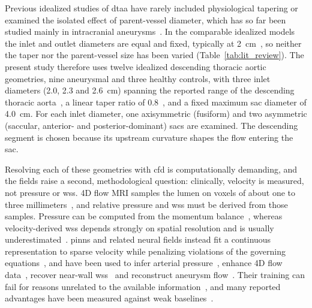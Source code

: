 \documentclass[12pt,a4paper]{article}
\newcommand{\CFD}{\ac{cfd}\xspace}
\newcommand{\DTAA}{\ac{dtaa}\xspace}
\newcommand{\WSS}{\ac{wss}\xspace}
\newcommand{\PINNscap}{\Acp{pinn}\xspace}
\theoremstyle{definition}
\numberwithin{equation}{section}
\begin{document}
Previous idealized studies of \DTAA have rarely included physiological tapering or examined the isolated effect of parent-vessel diameter, which has so far been studied mainly in intracranial aneurysms~\cite{fattahi2023influence}. In the comparable idealized models the inlet and outlet diameters are equal and fixed, typically at 2~cm~\cite{rehman2024comparative,rehman2025application}, so neither the taper nor the parent-vessel size has been varied (Table~\ref{tab:lit_review}). The present study therefore uses twelve idealized descending thoracic aortic geometries, nine aneurysmal and three healthy controls, with three inlet diameters (2.0, 2.3 and 2.6~cm) spanning the reported range of the descending thoracic aorta~\cite{hager2002diameters}, a linear taper ratio of 0.8~\cite{lu2019consistency}, and a fixed maximum sac diameter of 4.0~cm. For each inlet diameter, one axisymmetric (fusiform) and two asymmetric (saccular, anterior- and posterior-dominant) sacs are examined. The descending segment is chosen because its upstream curvature shapes the flow entering the sac.

Resolving each of these geometries with \CFD is computationally demanding, and the fields raise a second, methodological question: clinically, velocity is measured, not pressure or \WSS. 4D flow MRI samples the lumen on voxels of about one to three millimeters~\cite{markl2012fourd}, and relative pressure and \WSS must be derived from those samples. Pressure can be computed from the momentum balance~\cite{krittian2012finite, bertoglio2018relative}, whereas velocity-derived \WSS depends strongly on spatial resolution and is usually underestimated~\cite{stalder2008quantitative, petersson2012assessment, potters2015volumetric}. \PINNscap and related neural fields instead fit a continuous representation to sparse velocity while penalizing violations of the governing equations~\cite{raissi2019pinn, raissi2020hfm}, and have been used to infer arterial pressure~\cite{kissas2020machine}, enhance 4D flow data~\cite{fathi2020super, saitta2024implicit}, recover near-wall \WSS~\cite{arzani2021nearwall} and reconstruct aneurysm flow~\cite{cruzgonzalez2025aaa}. Their training can fail for reasons unrelated to the available information~\cite{krishnapriyan2021failure, wang2021gradient}, and many reported advantages have been measured against weak baselines~\cite{mcgreivy2024weak}.
\end{document}
